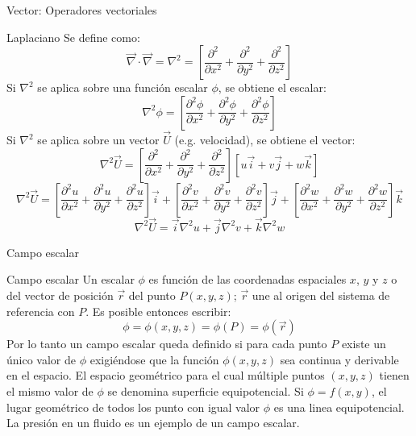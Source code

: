 \documentclass [xcolor=svgnames, t] {beamer}
\begin{document}
\begin{frame}{Vector: Operadores vectoriales}
\vspace{-0.5cm}
\footnotesize
\begin{block}{Laplaciano}
Se define como:
\begin{equation}
\vec{\nabla} \cdot \vec{\nabla} = \nabla^2 = \left[ \frac{\partial^2 }{\partial x^2} + \frac{\partial^2}{\partial y^2} + \frac{\partial^2}{\partial z^2} \right]
\label{lap}
\end{equation}
Si $\nabla^2$ se aplica sobre una funci\'on escalar $\phi$, se obtiene el escalar:
\begin{equation}
\nabla^2 \phi = \left[ \frac{\partial^2 \phi}{\partial x^2} + \frac{\partial^2 \phi}{\partial y^2} + \frac{\partial^2 \phi}{\partial z^2} \right]
\label{lap2}
\end{equation}
Si $\nabla^2$ se aplica sobre un vector  $\vec{U}$ (e.g. velocidad), se obtiene el vector:
$$
\nabla^2 \vec{U} = \left[ \frac{\partial^2}{\partial x^2} + \frac{\partial^2}{\partial y^2} + \frac{\partial^2}{\partial z^2} \right][u\vec{i}+v\vec{j}+w\vec{k}]
$$
$$
\nabla^2 \vec{U} = \left[ \frac{\partial^2 u}{\partial x^2} + \frac{\partial^2 u}{\partial y^2} + \frac{\partial^2 u}{\partial z^2} \right]\vec{i} + \left[ \frac{\partial^2 v}{\partial x^2} + \frac{\partial^2 v}{\partial y^2} + \frac{\partial^2 v}{\partial z^2} \right]\vec{j} + \left[ \frac{\partial^2 w}{\partial x^2} + \frac{\partial^2 w}{\partial y^2} + \frac{\partial^2 w}{\partial z^2} \right]\vec{k}
$$
\vspace{0.4cm}
\begin{equation}
\nabla^2 \vec{U} =\vec{i} \nabla^2 u + \vec{j} \nabla^2 v + \vec{k} \nabla^2 w
\label{lap3}
\end{equation}
\end{block}
\end{frame}


\begin{frame}{Campo escalar}
\begin{block}{Campo escalar}
Un escalar $\phi$ es funci\'on de las coordenadas espaciales $x$, $y$ y $z$ o del vector de posici\'on $\vec{r}$ del punto $P(x,y,z)$; $\vec{r}$ une al origen del sistema de referencia con  $P$. Es posible entonces escribir:
$$
\phi = \phi(x,y,z) = \phi(P)=\phi(\vec{r})
$$
Por lo tanto un campo escalar queda definido si para cada punto $P$ existe un \'unico valor de $\phi$ exigi\'endose que la funci\'on $\phi(x,y,z)$ sea continua y derivable en el espacio. El espacio geom\'etrico para el cual m\'ultiple puntos $(x,y,z)$ tienen el mismo valor de $\phi$ se denomina \alert{superficie equipotencial}. Si $\phi=f(x,y)$, el lugar geom\'etrico de todos los punto con igual valor $\phi$ es una \alert{linea equipotencial}. La presi\'on en un fluido es un ejemplo de un campo escalar.
\end{block}
\end{frame}
\end{document}
